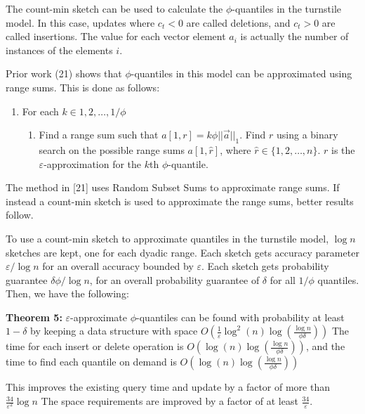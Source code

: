 \documentclass[11pt]{article}
\begin{document}
The count-min sketch can be used to calculate the $\phi$-quantiles in the turnstile model.
In this case, updates where $c_t < 0$ are called deletions, and $c_t > 0$ are called insertions.
The value for each vector element $a_i$ is actually the number of instances of the elements
$i$.

Prior work (21) shows that $\phi$-quantiles in this model can be approximated using range sums. This is done
as follows:
\begin{enumerate}
    \item For each $k \in {1, 2, \dots, 1/\phi}$
    \begin{enumerate}
        \item Find a range sum such that $a[1, r] = k\phi||\vec{a}||_1$. Find $r$ using a binary
        search on the possible range sums $a[1, \hat{r}]$, where $\hat{r} \in \{1, 2, \dots, n\}$.  $r$ is the
        $\varepsilon$-approximation for the $k$th $\phi$-quantile.
    \end{enumerate}
\end{enumerate}
The method in [21] uses Random Subset Sums to approximate range sums.  If instead a count-min
sketch is used to approximate the range sums, better results follow.  

To use a count-min sketch to approximate quantiles in the turnstile model, $\log n$ sketches are kept,
one for each dyadic range. Each sketch gets accuracy parameter $\varepsilon/\log n$ for an overall accuracy
bounded by $\varepsilon$. Each sketch gets probability guarantee $\delta\phi/\log n$, for
an overall probability guarantee of $\delta$ for all $1/\phi$ quantiles. Then, we have the following:

\textbf{Theorem 5:} $\varepsilon$-approximate $\phi$-quantiles can be found with probability at least
$1 - \delta$ by keeping a data structure with space $O\left(\frac{1}{\varepsilon}
\log^2(n) \log \left(\frac{\log n}{\phi \delta}\right)\right)$ The time for each insert or delete operation is
$O\left(\log(n) \log \left(\frac{\log n}{\phi \delta}\right)\right)$, and the time to find each quantile on demand 
is $O\left(\log(n)\log\left(\frac{\log n}{\phi \delta}\right)\right)$

This improves the existing query time and update by a factor of more than $\frac{34}{\varepsilon^2} \log n$
The space requirements are improved by a factor of at least $\frac{34}{\varepsilon}$. 
\end{document}
